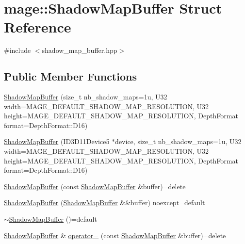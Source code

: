 \hypertarget{structmage_1_1_shadow_map_buffer}{}\section{mage\+:\+:Shadow\+Map\+Buffer Struct Reference}
\label{structmage_1_1_shadow_map_buffer}


{\ttfamily \#include $<$shadow\+\_\+map\+\_\+buffer.\+hpp$>$}

\subsection*{Public Member Functions}
\begin{DoxyCompactItemize}
\item 
\hyperlink{structmage_1_1_shadow_map_buffer_af10514b30b6f513fb5338662465cc704}{Shadow\+Map\+Buffer} (size\+\_\+t nb\+\_\+shadow\+\_\+maps=1u, U32 width=\+M\+A\+G\+E\+\_\+\+D\+E\+F\+A\+U\+L\+T\+\_\+\+S\+H\+A\+D\+O\+W\+\_\+\+M\+A\+P\+\_\+\+R\+E\+S\+O\+L\+U\+T\+I\+O\+N, U32 height=\+M\+A\+G\+E\+\_\+\+D\+E\+F\+A\+U\+L\+T\+\_\+\+S\+H\+A\+D\+O\+W\+\_\+\+M\+A\+P\+\_\+\+R\+E\+S\+O\+L\+U\+T\+I\+O\+N, Depth\+Format format=\+Depth\+Format\+::\+D16)
\item 
\hyperlink{structmage_1_1_shadow_map_buffer_a4c31a99a576d9dd799f21cfb3639f783}{Shadow\+Map\+Buffer} (I\+D3\+D11\+Device5 $\ast$device, size\+\_\+t nb\+\_\+shadow\+\_\+maps=1u, U32 width=\+M\+A\+G\+E\+\_\+\+D\+E\+F\+A\+U\+L\+T\+\_\+\+S\+H\+A\+D\+O\+W\+\_\+\+M\+A\+P\+\_\+\+R\+E\+S\+O\+L\+U\+T\+I\+O\+N, U32 height=\+M\+A\+G\+E\+\_\+\+D\+E\+F\+A\+U\+L\+T\+\_\+\+S\+H\+A\+D\+O\+W\+\_\+\+M\+A\+P\+\_\+\+R\+E\+S\+O\+L\+U\+T\+I\+O\+N, Depth\+Format format=\+Depth\+Format\+::\+D16)
\item 
\hyperlink{structmage_1_1_shadow_map_buffer_a276a32f787cda940ac36df461d0ce3ea}{Shadow\+Map\+Buffer} (const \hyperlink{structmage_1_1_shadow_map_buffer}{Shadow\+Map\+Buffer} \&buffer)=delete
\item 
\hyperlink{structmage_1_1_shadow_map_buffer_a0aa29978a2c482614aa1c46e9be0b50a}{Shadow\+Map\+Buffer} (\hyperlink{structmage_1_1_shadow_map_buffer}{Shadow\+Map\+Buffer} \&\&buffer) noexcept=default
\item 
\hyperlink{structmage_1_1_shadow_map_buffer_a34eedd164d45a009ddecc97c8739c80b}{$\sim$\+Shadow\+Map\+Buffer} ()=default
\item 
\hyperlink{structmage_1_1_shadow_map_buffer}{Shadow\+Map\+Buffer} \& \hyperlink{structmage_1_1_shadow_map_buffer_ace8a042252b8285a7f6ceb838053f7f6}{operator=} (const \hyperlink{structmage_1_1_shadow_map_buffer}{Shadow\+Map\+Buffer} \&buffer)=delete

\end{DoxyCompactItemize}
